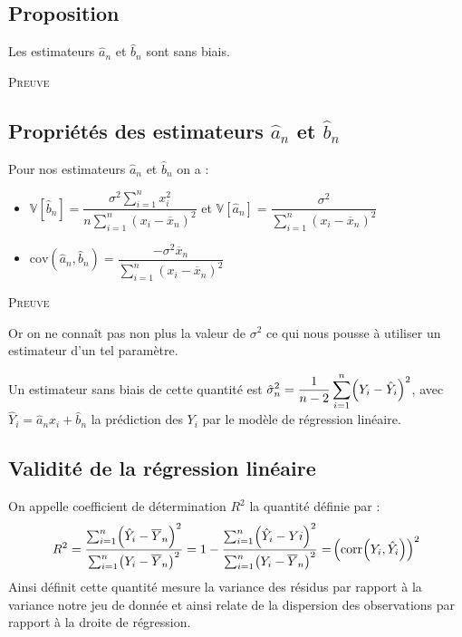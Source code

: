 \documentclass[12pt]{article}
\newcommand{\dps}{\displaystyle}
\newcommand{\parr}[1]{\hspace{-0.05cm}\left(#1 \right)}
\newcommand{\rect}[1]{\left[ #1 \right]}
\newcommand{\mb}[1]{\mathbb{#1}}
\begin{document}
\subsection*{Proposition}
Les estimateurs $\hat{a}_{n}$ et $\hat{b}_{n}$ sont sans biais.

\textsc{Preuve}


\subsection{Propriétés des estimateurs $\hat{a}_{n}$ et $\hat{b}_{n}$}
Pour nos estimateurs $\hat{a}_{n}$ et $\hat{b}_{n}$ on a :
\begin{itemize}[label*=\textbullet]
	\item $\mb{V}\rect{\hat{b}_{n}} = \dfrac{\sigma^{2} \sum_{i=1}^{n} x_i^2}{n\sum_{i=1}^{n}(x_{i} - \overline{x}_{n})^2 }$ et $\mb{V}\rect{\hat{a}_n} = \dfrac{\sigma^2}{\sum_{i=1}^{n} (x_i - \overline{x}_{n})^2}$
	\item $\mathrm{cov}(\hat{a}_{n},\hat{b}_{n}) = \dfrac{-\sigma^{2}\overline{x}_{n}}{\sum_{i=1}^{n} (x_i - \overline{x}_{n})^2}$
\end{itemize}

\textsc{Preuve}



Or on ne connaît pas non plus la valeur de $\sigma^2$ ce qui nous pousse à utiliser un estimateur d'un tel paramètre.

Un estimateur sans biais de cette quantité est $\dps \hat{\sigma}^{2}_{n} = \dfrac{1}{n-2}\sum_{i=1}^{n}\parr{Y_{i} - \hat{Y}_{i}}^2$, avec $\hat{Y}_{i} = \hat{a}_{n}x_i + \hat{b}_{n}$ la prédiction des $Y_{i}$ par le modèle de régression linéaire.

\subsection{Validité de la régression linéaire}
On appelle coefficient de détermination $R^{2}$ la quantité définie par : 
\begin{equation*}
	R^{2} = \dfrac{\sum_{i=1}^{n} \parr{\hat{Y}_i - \overline{Y}_{n} }^{2} }{\sum_{i=1}^{n}\parr{Y_i - \overline{Y}_{n}}^{2} } = 1 - \dfrac{\sum_{i=1}^{n} \parr{\hat{Y}_{i} - Yi}^{2} }{\sum_{i=1}^{n}\parr{Y_i - \overline{Y}_{n}}^{2}} = \parr{\mathrm{corr}\parr{Y_i,\hat{Y}_i}}^{2}
\end{equation*}
Ainsi définit cette quantité mesure la variance des résidus par rapport à la variance notre jeu de donnée et ainsi relate de la dispersion des observations par rapport à la droite de régression.
\end{document}
